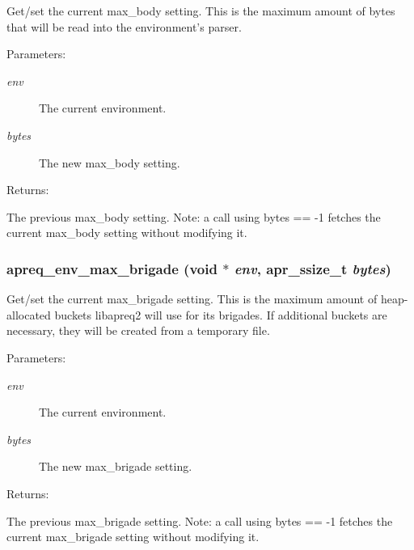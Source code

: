 Get/set the current max\_\-body setting. This is the maximum amount of bytes that will be read into the environment's parser. \begin{Desc}
\item[Parameters: ]\par
\begin{description}
\item[{\em 
env}]The current environment. \item[{\em 
bytes}]The new max\_\-body setting. \end{description}
\end{Desc}
\begin{Desc}
\item[Returns: ]\par
The previous max\_\-body setting. Note: a call using bytes == -1 fetches the current max\_\-body setting without modifying it. \end{Desc}
\subsubsection{ apreq\_\-env\_\-max\_\-brigade ({\bf void} $\ast$ {\em env}, {\bf apr\_\-ssize\_\-t} {\em bytes})}\label{group__ENV_a11}


Get/set the current max\_\-brigade setting. This is the maximum amount of heap-allocated buckets libapreq2 will use for its brigades.  If additional buckets are necessary, they will be created from a temporary file. \begin{Desc}
\item[Parameters: ]\par
\begin{description}
\item[{\em 
env}]The current environment. \item[{\em 
bytes}]The new max\_\-brigade setting. \end{description}
\end{Desc}
\begin{Desc}
\item[Returns: ]\par
The previous max\_\-brigade setting. Note: a call using bytes == -1 fetches the current max\_\-brigade setting without modifying it. \end{Desc}
